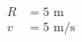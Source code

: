 \documentclass[preview]{standalone}
\begin{document}
\begin{align*}
R &= 5 \text{ m} \\ v &= 5 \text{ m/s}
\end{align*}
\end{document}
